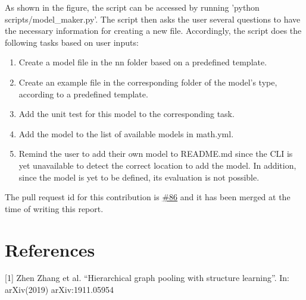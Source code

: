 \documentclass[12pt,a4paper]{article}
\begin{document}
	\vspace{-0.4cm}
	\noindent As shown in the figure, the script can be accessed by running 'python scripts/model\_maker.py'. The script then asks the user several questions to have the necessary information for creating a new file. Accordingly, the script does the following tasks based on user inputs:
	
	\begin{enumerate}
		\item Create a model file in the nn folder based on a predefined template.
		\item Create an example file in the corresponding folder of the model's type, according to a predefined template.
		\item Add the unit test for this model to the corresponding task.
		\item Add the model to the list of available models in math.yml.
		\item Remind the user to add their own model to README.md since the CLI is yet unavailable to detect the correct location to add the model. In addition, since the model is yet to be defined, its evaluation is not possible.
	\end{enumerate}

	\noindent The pull request id for this contribution is \href{https://github.com/THUDM/cogdl/pull/86}{\#86}  and it has been merged at the time of writing this report.
	
	\vspace{-0.4cm}
	\section*{References}
	[1] Zhen Zhang et al. “Hierarchical graph pooling with structure learning”. In: arXiv(2019) arXiv:1911.05954


	
\end{document}
